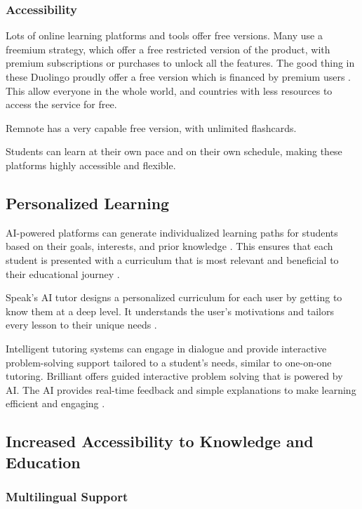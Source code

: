 \documentclass{article}
\begin{document}
\subsubsection{Accessibility}
Lots of online learning platforms and tools offer free versions.
Many use a freemium strategy, which offer a free restricted version
of the product, with premium subscriptions or purchases to unlock
all the features. The good thing in these Duolingo proudly offer
a free version which is financed by premium users
\cite{make_learning_as_addictive_as_social_media}.
This allow everyone in the whole world, and countries
with less resources to access the service for free.

Remnote has a very capable free version, with unlimited flashcards.

Students can learn at their own pace and on their own schedule,
making these platforms highly accessible and flexible.

\subsection{Personalized Learning}

AI-powered platforms can generate individualized learning paths for
students based on their goals, interests, and prior knowledge
\cite{elearningindustry_ai_personalization}.
This ensures that each student is presented with a curriculum that is most relevant and beneficial to their educational journey
\cite{thinkful_ai_adaptive_curriculum}.

Speak's AI tutor designs a personalized curriculum for each user
by getting to know them at a deep level. It understands the user's
motivations and tailors every lesson to their unique needs
\cite{speak}.

Intelligent tutoring systems can engage in dialogue and provide
interactive problem-solving support tailored to a student's needs,
similar to one-on-one tutoring. Brilliant offers guided interactive
problem solving that is powered by AI. The AI provides real-time
feedback and simple explanations to make learning efficient and
engaging \cite{brilliant}.

\subsection{Increased Accessibility to Knowledge and Education}

\subsubsection{Multilingual Support}
\end{document}
